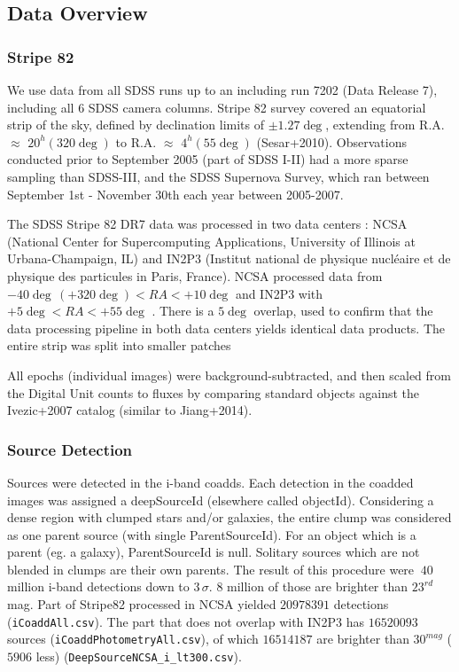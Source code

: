 \documentclass[fleqn,usenatbib]{mnras}  %
\begin{document}
\subsection{Data Overview}
\label{sec:data}
\subsubsection{Stripe 82}
We use data from all SDSS runs up to an including run 7202 (Data Release 7), including all 6 SDSS camera columns. Stripe 82 survey covered an equatorial strip of the sky, defined by declination limits of $\pm1.27\deg$, extending from R.A. $\approx$ $20^{h} (320 \deg)$ to R.A.  $\approx$ $4^{h} (55 \deg)$ (Sesar+2010). Observations conducted prior to September 2005 (part of SDSS I-II) had a more sparse sampling than SDSS-III, and the SDSS Supernova Survey, which ran between September 1st - November 30th each year between 2005-2007. 

The SDSS Stripe 82 DR7  data  was processed in two data centers : NCSA (National Center for Supercomputing Applications, University of Illinois at Urbana-Champaign, IL) and IN2P3  (Institut national de physique nucl\'eaire et de physique des particules in Paris, France). NCSA processed data from $-40 \deg \, (+320 \deg) < RA < +10 \deg $ and IN2P3 with $ +5 \deg < RA < +55 \deg$ . There is a $5 \deg$ overlap, used to confirm that the data processing pipeline in both data centers yields identical data products. The entire strip was split into smaller patches

All epochs (individual images) were background-subtracted, and then scaled from the Digital Unit counts to fluxes by comparing standard objects against the Ivezic+2007 catalog  (similar to  Jiang+2014).   

\subsubsection{Source Detection}
Sources were detected in the i-band coadds. Each detection in the coadded images was assigned a deepSourceId (elsewhere called objectId). Considering  a dense region with clumped stars and/or galaxies, the entire clump was considered as one parent source (with single ParentSourceId). For an object which is a parent (eg. a galaxy), ParentSourceId is null. Solitary sources which are not blended  in clumps are their own parents. The result of this procedure were $~40$ million  i-band detections down to $3 \, \sigma$.  $8$ million of those are brighter than $23^{rd}$ mag. Part of Stripe82 processed in NCSA yielded  $20978391$ detections (\verb|iCoaddAll.csv|). The part that does not overlap with IN2P3 has   $16520093$ sources (\verb|iCoaddPhotometryAll.csv|), of which  $16514187$ are brighter than $30^{mag}$  ($5906$ less) (\verb|DeepSourceNCSA_i_lt300.csv|).
\end{document}
